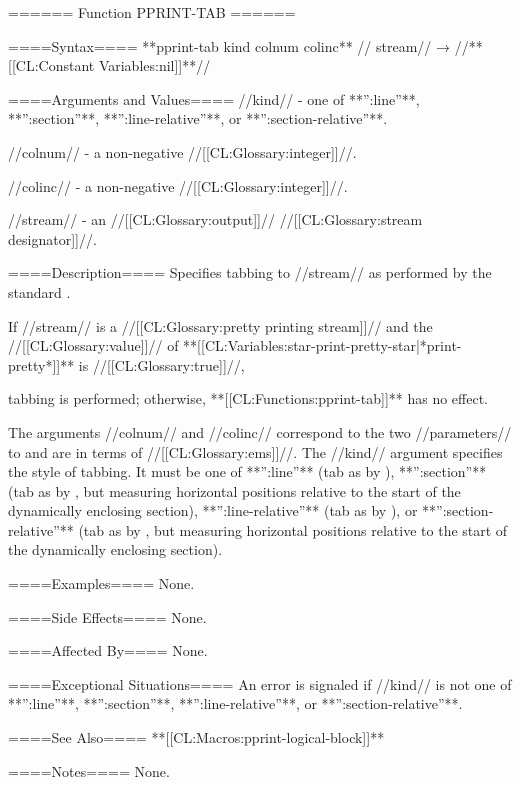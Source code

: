 ====== Function PPRINT-TAB ======

====Syntax====
**pprint-tab {kind colnum colinc** //\opt} stream// → //**[[CL:Constant Variables:nil]]**//

====Arguments and Values====
//kind// - one of **'':line''**, **'':section''**, **'':line-relative''**, or **'':section-relative''**.

//colnum// - a non-negative //[[CL:Glossary:integer]]//.

//colinc// - a non-negative //[[CL:Glossary:integer]]//.

//stream// - an //[[CL:Glossary:output]]// //[[CL:Glossary:stream designator]]//.

====Description====
Specifies tabbing to //stream// as performed by the standard .

If //stream// is a //[[CL:Glossary:pretty printing stream]]// and the //[[CL:Glossary:value]]// of **[[CL:Variables:star-print-pretty-star|*print-pretty*]]** is //[[CL:Glossary:true]]//,

tabbing is performed; otherwise, **[[CL:Functions:pprint-tab]]** has no effect.

The arguments //colnum// and //colinc// correspond to the two //parameters// to  and are in terms of //[[CL:Glossary:ems]]//. The //kind// argument specifies the style of tabbing. It must be one of **'':line''** (tab as by ), **'':section''** (tab as by , but measuring horizontal positions relative to the start of the dynamically enclosing section), **'':line-relative''** (tab as by ), or **'':section-relative''** (tab as by , but measuring horizontal positions relative to the start of the dynamically enclosing section).

====Examples====
None.

====Side Effects====
None.

====Affected By====
None.

====Exceptional Situations====
An error is signaled if //kind// is not one of **'':line''**, **'':section''**, **'':line-relative''**, or **'':section-relative''**.

====See Also====
**[[CL:Macros:pprint-logical-block]]**

====Notes====
None.

 
